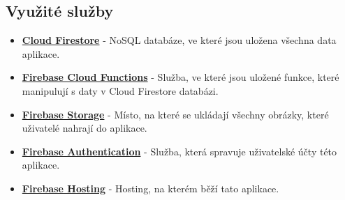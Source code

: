 \documentclass[a4paper,12pt]{article}
\begin{document}
\subsection{Využité služby}
\begin{itemize}
\item
  \textbf{\href{https://cloud.google.com/firestore}{Cloud Firestore}} - NoSQL
  databáze, ve které jsou uložena všechna data aplikace.
\item
  \textbf{\href{https://firebase.google.com/docs/functions}{Firebase Cloud
  Functions}} - Služba, ve které jsou uložené funkce, které manipulují s
  daty v Cloud Firestore databázi.
\item
  \textbf{\href{https://firebase.google.com/docs/storage}{Firebase Storage}} -
  Místo, na které se ukládají všechny obrázky, které uživatelé nahrají
  do aplikace.
\item
  \textbf{\href{https://firebase.google.com/docs/auth}{Firebase Authentication}}
  - Služba, která spravuje uživatelské účty této aplikace.
\item
  \textbf{\href{https://firebase.google.com/docs/hosting}{Firebase Hosting}} -
  Hosting, na kterém běží tato aplikace.
\end{itemize}
\end{document}
